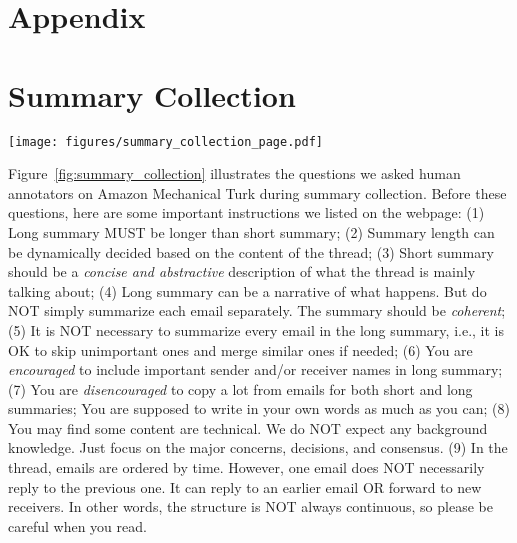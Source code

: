 \appendix
\section*{Appendix}
\section{Summary Collection}
\label{appedix:summay_annotation}
\begin{figure*}
    \centering
    \texttt{[image: figures/summary\_collection\_page.pdf]}
    \vspace{-3pt}
    \caption{A part of the Amazon Mechanical Turk webpage used for collecting summaries.}
    \label{fig:summary_collection}
    \vspace{-10pt}
\end{figure*}

Figure~\ref{fig:summary_collection} illustrates the questions we asked human annotators on Amazon Mechanical Turk during summary collection. 
Before these questions, here are some important instructions we listed on the webpage: (1) Long summary MUST be longer than short summary; (2) Summary length can be dynamically decided based on the content of the thread; (3) Short summary should be a \emph{concise and abstractive} description of what the thread is mainly talking about; (4) Long summary can be a narrative of what happens. But do NOT simply summarize each email separately. The summary should be \emph{coherent}; (5) It is NOT necessary to summarize every email in the long summary, i.e., it is OK to skip unimportant ones and merge similar ones if needed; (6) You are \emph{encouraged} to include important sender and/or receiver names in long summary; (7) You are \emph{disencouraged} to copy a lot from emails for both short and long summaries; You are supposed to write in your own words as much as you can; (8) You may find some content are technical. We do NOT expect any background knowledge. Just focus on the major concerns, decisions, and consensus. (9) In the thread, emails are ordered by time. However, one email does NOT necessarily reply to the previous one. It can reply to an earlier email OR forward to new receivers. In other words, the structure is NOT always continuous, so please be careful when you read.



